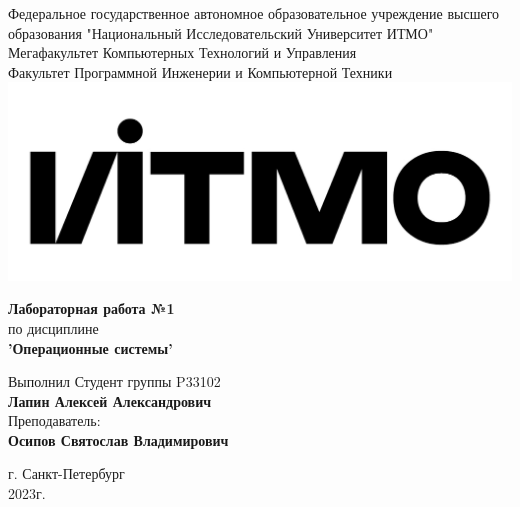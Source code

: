 \documentclass[12pt,onecolumn]{article}
\begin{document}
\setcounter{tocdepth}{4}
\begin{center}
    Федеральное государственное автономное образовательное учреждение высшего образования "Национальный Исследовательский Университет ИТМО"\\ 
    Мегафакультет Компьютерных Технологий и Управления\\
    Факультет Программной Инженерии и Компьютерной Техники \\
    \includegraphics[scale=0.3]{image/itmo.jpg} %
\end{center}
\vspace{1cm}


\begin{center}
    \textbf{Лабораторная работа №1}\\
    по дисциплине\\
    \textbf{'Операционные системы'}\\
\end{center}

\vspace{2cm}

\begin{flushright}
  Выполнил Студент  группы P33102\\
  \textbf{Лапин Алексей Александрович}\\
  Преподаватель: \\
  \textbf{Осипов Святослав Владимирович}\\
\end{flushright}

\vspace{6cm}
\begin{center}
    г. Санкт-Петербург\\
    2023г.
\end{center}

\newpage
\tableofcontents
\newpage




\end{document}
